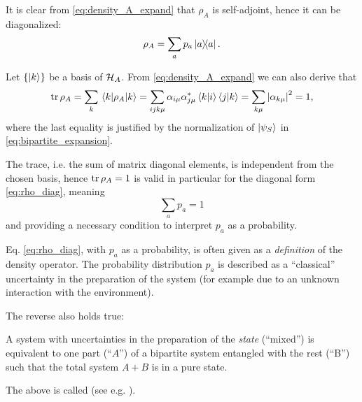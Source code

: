 It is clear from \eqref{eq:density_A_expand} that $\rho_A$ is self-adjoint,
hence it can be diagonalized:
\begin{equation}\label{eq:rho_diag}
  \rho_A = \sum_a p_a \ketbra{a}{a} \text{.}
\end{equation}

Let $\left\{\ket{k}\right\}$ be a basis of $\mathcal{H}_A$.
From \eqref{eq:density_A_expand} we can also derive that
\begin{equation}
  \tr\rho_A = \sum_k \mel{k}{\rho_A}{k} =
    \sum_{ijk\mu}\alpha_{i\mu}\alpha_{j\mu}^{*}\braket{k}{i}\braket{j}{k} =
    \sum_{k\mu}\abs{\alpha_{k\mu}}^2 = 1 \text{,}
\end{equation}
where the last equality is justified by the normalization of $\ket{\psi_S}$
in \eqref{eq:bipartite_expansion}.

The trace, i.e. the sum of matrix diagonal elements, is independent
from the chosen basis, hence $\tr\rho_A = 1$ is valid in particular
for the diagonal form \eqref{eq:rho_diag}, meaning
\[
  \sum_a p_a = 1
\]
and providing a necessary condition to interpret $p_a$ as a probability.

Eq. \eqref{eq:rho_diag}, with $p_a$ as a probability, is often
given as a \emph{definition} of the density operator.
The probability distribution ${p_a}$
is described as a ``classical'' uncertainty in the preparation of the system
(for example due to an unknown interaction with the environment).

The reverse also holds true:
\begin{proposition}
A system with uncertainties in the preparation of the \emph{state}
(``mixed'') is equivalent to one part (``$A$'') of a bipartite system
entangled with the rest (``B'') such that the total system
$A+B$ is in a pure state.
\end{proposition}

The above is called  (see e.g. \cite[]{NielsenChuang}).

